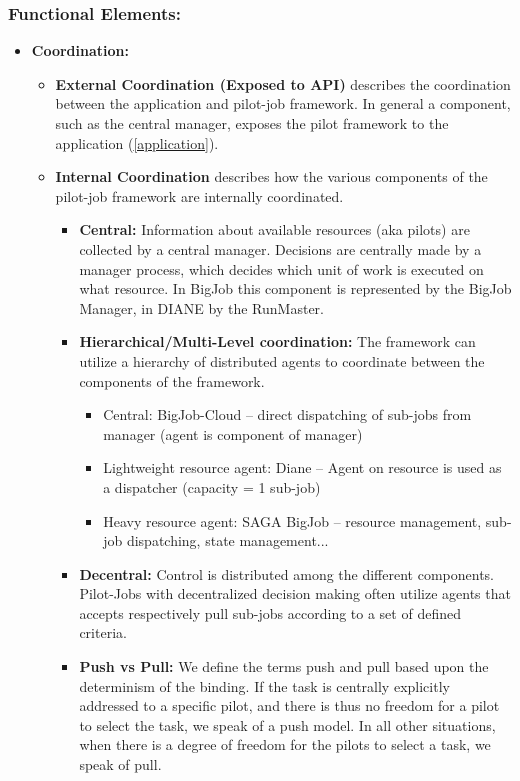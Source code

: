 \documentclass[conference,final]{IEEEtran}
\begin{document}
\subsubsection{Functional Elements:}
\begin{itemize}

    \item \textbf{Coordination:}
    \begin{itemize}
    \item \textbf{External Coordination (Exposed to API)} describes the 
    coordination between the application and pilot-job framework. In general a 
    component, such 
	 as the central manager, exposes the pilot framework to the  application 
	 (\ref{application}). 
	 \item \textbf{Internal Coordination} describes how the various components of the 
     pilot-job framework are internally coordinated.
     		\begin{itemize}
     			\item \textbf{Central:} Information about available resources (aka 
     			pilots) are collected by a central manager.  Decisions are centrally 
     			made by a manager process, which decides which unit 
        		    of work  is executed on what resource. In BigJob 
      		    this component is  represented by the BigJob Manager, in DIANE 
      		    by the RunMaster.
      			 \item \textbf{Hierarchical/Multi-Level coordination:} The 
      			 framework can  utilize a hierarchy of distributed agents to 
      			 coordinate between the components of the framework. 
                  \begin{itemize}
                  	    \item Central: BigJob-Cloud -- direct dispatching of 
                  	    sub-jobs from manager (agent is component of manager)
                          \item Lightweight resource agent: Diane -- Agent on 
                          resource is used as a dispatcher (capacity = 1 sub-job)
                          \item Heavy resource agent: SAGA BigJob -- resource 
                          management, sub-job dispatching, state management...
                  \end{itemize}
     			\item \textbf{Decentral:} Control is distributed among the 
     			different components. Pilot-Jobs with decentralized decision 
     			making often utilize agents that accepts respectively pull 
     			sub-jobs according to a set of defined criteria.
     			\item \textbf{Push vs Pull:} We define the terms push and pull 
         				based upon the determinism of the binding. If the task is 
         				centrally explicitly addressed to a specific pilot, and 
         				there is thus no freedom for a pilot to select the task, we 
         				speak of a push model. In all other situations, when there 
         				is a degree of freedom for the pilots to select a task, we 
         				speak of pull.


\end{itemize}
\end{itemize}
\end{itemize}
\end{document}

